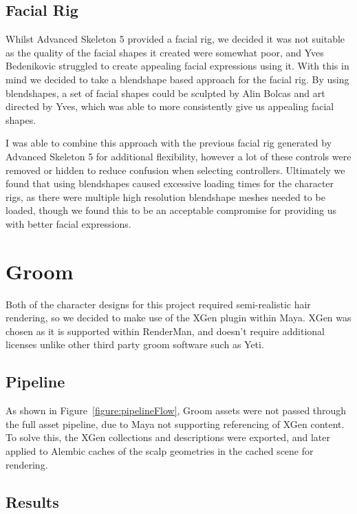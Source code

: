 \documentclass[11pt]{article}
\begin{document}
\subsection{Facial Rig}

Whilst Advanced Skeleton 5 provided a facial rig, we decided it was not suitable as the quality of the facial shapes it created were somewhat poor, and Yves Bedenikovic struggled to create appealing facial expressions using it. With this in mind we decided to take a blendshape based approach for the facial rig. By using blendshapes, a set of facial shapes could be sculpted by Alin Bolcas and art directed by Yves, which was able to more consistently give us appealing facial shapes.

I was able to combine this approach with the previous facial rig generated by Advanced Skeleton 5 for additional flexibility, however a lot of these controls were removed or hidden to reduce confusion when selecting controllers. Ultimately we found that using blendshapes caused excessive loading times for the character rigs, as there were multiple high resolution blendshape meshes needed to be loaded, though we found this to be an acceptable compromise for providing us with better facial expressions.

\section{Groom}

Both of the character designs for this project required semi-realistic hair rendering, so we decided to make use of the XGen plugin within Maya. XGen was chosen as it is supported within RenderMan, and doesn't require additional licenses unlike other third party groom software such as Yeti.

\subsection{Pipeline}

As shown in Figure~\ref{figure:pipelineFlow}, Groom assets were not passed through the full asset pipeline, due to Maya not supporting referencing of XGen content. To solve this, the XGen collections and descriptions were exported, and later applied to Alembic caches of the scalp geometries in the cached scene for rendering.

\subsection{Results}
\end{document}
